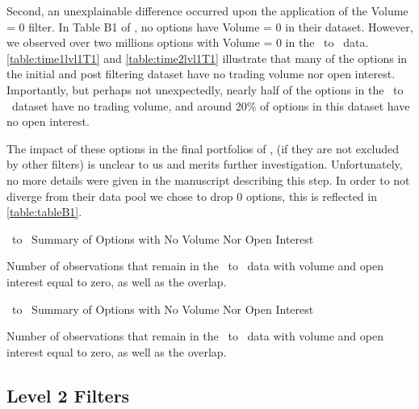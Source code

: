 Second, an unexplainable difference occurred upon the application of the Volume = 0 filter. In Table B1 of \citet{constantinides2013}, no options have Volume = 0 in their dataset. However, we observed over two millions options with Volume = 0 in the \STARTONE\ to \ENDONE\ data.
\autoref{table:time1lvl1T1} and \autoref{table:time2lvl1T1} illustrate that many of the options in the initial and post filtering dataset have no trading volume nor open interest. Importantly, but perhaps not unexpectedly, nearly half of the options in the \STARTONE\ to \ENDONE\ dataset have no trading volume, and around 20\% of options in this dataset have no open interest. 

The impact of these options in the final portfolios of \citet{constantinides2013}, (if they are not excluded by other filters) is unclear to us and merits further investigation. Unfortunately, no more details were given in the manuscript describing this step. In order to not diverge from their data pool we chose to drop 0 options, this is reflected in \autoref{table:tableB1}.


\vspace{20pt}
\begin{table}[H]

  \centering
  \caption{\STARTONE\ to \ENDONE\ Summary of Options with No Volume Nor Open Interest}
  
  
  \caption*{
    Number of observations that remain in the \STARTONE\ to \ENDONE\ data with volume and open interest equal to zero, as well as the overlap. 
  }
  \label{table:time1lvl1T1}
\end{table}
  
  
\vspace{20pt}
\begin{table}[H]
  \centering
  \caption{\STARTTWO\ to \ENDTWO\ Summary of Options with No Volume Nor Open Interest}
  
  
  \caption*{
    Number of observations that remain in the \STARTTWO\ to \ENDTWO\ data with volume and open interest equal to zero, as well as the overlap. 
  }
  \label{table:time2lvl1T1}
\end{table}

\clearpage

\subsection {Level 2 Filters}
